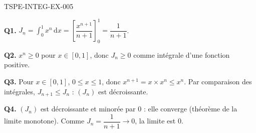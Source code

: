 \begin{corrige}{TSPE-INTEG-EX-005}

\textbf{Q1.} $J_n = \displaystyle\int_0^1 x^n\,\mathrm{d}x = \left[\dfrac{x^{n+1}}{n+1}\right]_0^1 = \dfrac{1}{n+1}$.

\textbf{Q2.} $x^n \geq 0$ pour $x \in [0,1]$, donc $J_n \geq 0$ comme intégrale d'une fonction positive.

\textbf{Q3.} Pour $x \in [0,1]$, $0 \leq x \leq 1$, donc $x^{n+1} = x \times x^n \leq x^n$. Par comparaison des intégrales, $J_{n+1} \leq J_n$ : $(J_n)$ est décroissante.

\textbf{Q4.} $(J_n)$ est décroissante et minorée par $0$ : elle converge (théorème de la limite monotone). Comme $J_n = \dfrac{1}{n+1} \to 0$, la limite est $0$.

\end{corrige}
